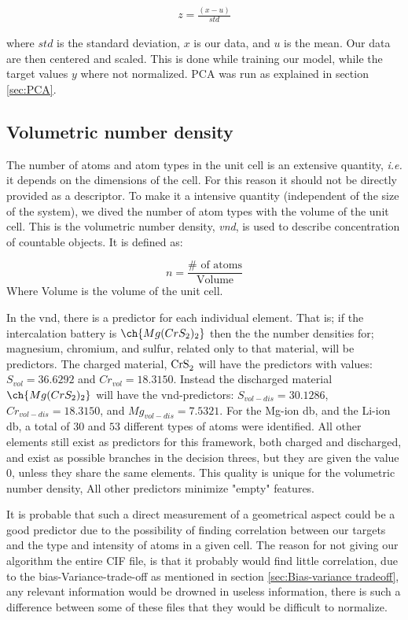 	\begin{align}
	z = \frac{(x-u)}{std}
	\end{align}
	
	where $std$ is the standard deviation, $x$ is our data, and $u$ is the mean. Our data are then centered and scaled. This is done while training our model, while the target values $y$ where not normalized. PCA was run as explained in section \ref{sec:PCA}. 	
	

\subsection{Volumetric number density } \label{sec:volumetric_number_density}

	The number of atoms and atom types in the unit cell is an extensive quantity, \textit{i.e.} it depends on the dimensions of the cell. For this reason it should not be directly provided as a descriptor. To make it a intensive quantity (independent of the size of the system), we dived the number of atom types with the volume of the unit cell. This is the volumetric number density, \textit{vnd}, is used to describe concentration of countable objects. It is defined as: 
	
\begin{equation}\label{eq:n}
n= \frac{\#\text{ of atoms}}{\text{Volume}}
\end{equation}
	Where Volume is the volume of the unit cell.
	
	In the vnd, there is a predictor for each individual element. That is; if the intercalation battery is $\ch{Mg(CrS_2)_2}$ then the the number densities for; magnesium, chromium, and sulfur, related only to that material, will be predictors. The charged material, $\ce{CrS_2}$ will have the predictors with values: $S_{vol} = 36.6292$ and $Cr_{vol} = 18.3150 $. Instead the discharged material $\ch{Mg(CrS_2)_2}$ will have the vnd-predictors: $S_{vol-dis} = 30.1286$, $Cr_{vol-dis} =18.3150 $, and $Mg_{vol-dis} = 7.5321$. For the Mg-ion db, and the Li-ion db, a total of $30$ and $53$ different types of atoms were identified. All other elements still exist as predictors for this framework, both charged and discharged, and exist as possible branches in the decision threes, but they are given the value $0$, unless they share the same elements. This quality is unique for the volumetric number density, All other predictors minimize "empty" features. 
	

It is probable that such a direct measurement of a geometrical aspect could be a good predictor due to the possibility of finding correlation between our targets and the type and intensity of atoms in a given cell. The reason for not giving our algorithm the entire CIF file, is that it probably would find little correlation, due to the bias-Variance-trade-off as mentioned in section \ref{sec:Bias-variance tradeoff}, any relevant information would be drowned in useless information, there is such a difference between some of these files that they would be difficult to normalize.


